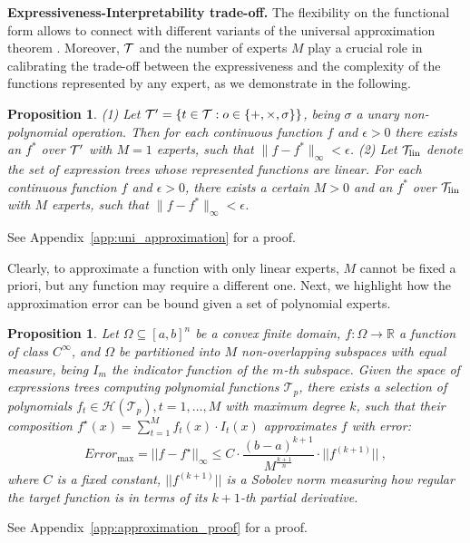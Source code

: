\documentclass{article}
\theoremstyle{plain}
\newtheorem{proposition}[theorem]{Proposition}
\theoremstyle{definition}
\theoremstyle{remark}
\newcommand{\mypar}[1]{\noindent\textbf{#1}}
\begin{document}
\mypar{Expressiveness-Interpretability trade-off. }
The flexibility on the functional form allows   to connect with different variants of the universal approximation theorem \cite{cybenko1989approximation}. 
Moreover, $\mathcal{T}$ and the number of experts $M$ play a crucial role in calibrating the trade-off between the expressiveness and the complexity of the functions represented by any expert, as we demonstrate in the following.

\begin{proposition}
\label{theo:uni_approximation}
(1) Let $\mathcal{T}'=\{t\in\mathcal{T}:o\in\{+,\times,\sigma\}\}$, being $\sigma$ a unary non-polynomial operation. Then for each continuous function $f$ and $\epsilon>0$ there exists an \classacrosingular{} $f^*$ over $\mathcal{T}'$ with $M=1$ experts, such that $\|f-f^*\|_\infty<\epsilon$.
(2) 
Let $\mathcal{T}_{\text{lin}}$ denote the set of expression trees whose represented functions are linear. 
For each continuous function $f$ and $\epsilon>0$, there exists a certain $M>0$ and  an \classacrosingular{} $f^*$  over $\mathcal{T}_{\text{lin}}$ with $M$ experts, such that  $\|f-f^*\|_\infty<\epsilon$. 
\end{proposition}
See Appendix~\ref{app:uni_approximation} for a proof.

Clearly, to approximate a function with only linear experts, $M$ cannot be fixed a priori, but any function may require a different one. Next, we highlight how the approximation error can be bound given a set of polynomial experts.

\begin{proposition}
\label{theo:bound}
Let $\Omega \subseteq [a, b]^n$ be a convex finite domain, $f:\Omega \rightarrow \mathbb{R}$ a function of class $C^\infty$, and $\Omega$ be partitioned into $M$ non-overlapping subspaces with equal measure, being $I_m$ the indicator function of the $m$-th subspace.
Given the space of expressions trees computing polynomial functions $\mathcal{T}_p$, there exists a selection of polynomials $f_t \in \mathcal{H}(\mathcal{T}_p), t=1, \dots, M$ with maximum degree $k$, such that their composition $f^\star(x) = \displaystyle\sum_{t=1}^{M} f_t(x) \cdot I_t(x)$ approximates $f$ with error:
\[
Error_{\text{max}} = ||f - f^\star||_\infty \le C \cdot \frac{(b-a)^{k+1}}{{M}^{\frac{k+1}{n}}} \cdot ||f^{(k+1)}|| \ ,
\]
where $C$ is a fixed constant, $||f^{(k+1)}||$ is a Sobolev norm measuring how regular the target function is in terms of its $k+1$-th partial derivative.
\end{proposition}
See Appendix~\ref{app:approximation_proof} for a proof.
\end{document}
